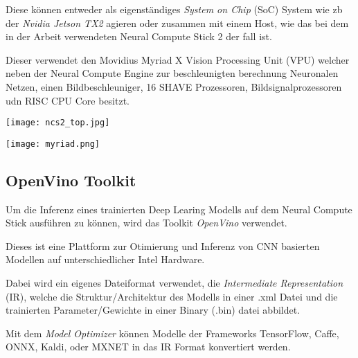 Diese können entweder als eigenständiges \textit{System on Chip}
(SoC) System wie zb der \textit{Nvidia Jetson TX2} agieren oder 
zusammen mit einem Host, wie das bei dem in der Arbeit verwendeten 
Neural Compute Stick 2 der fall ist.

Dieser verwendet den Movidius Myriad X Vision Processing Unit (VPU)
welcher neben der Neural Compute Engine zur beschleunigten berechnung 
Neuronalen Netzen, einen Bildbeschleuniger, 16 SHAVE Prozessoren, 
Bildsignalprozessoren udn RISC CPU Core besitzt.
\cite{haussermannFunktionUndEffizienz}
\\[1cm]
\begin{minipage}{0.4\textwidth}
    \centering
    \label{fig:ncs2}
    \texttt{[image: ncs2\_top.jpg]}
\end{minipage}
\begin{minipage}{0.6\textwidth}
    \centering
    \label{fig:myriad}
    \texttt{[image: myriad.png]}
\end{minipage}


\subsection{OpenVino Toolkit}



Um die Inferenz eines trainierten Deep Learing Modells auf dem
Neural Compute Stick ausführen zu können, wird das Toolkit 
\textit{OpenVino} verwendet.

Dieses ist eine Plattform zur Otimierung und Inferenz von 
CNN basierten Modellen auf unterschiedlicher Intel Hardware.





Dabei wird ein eigenes Dateiformat verwendet, die \textit{Intermediate 
Representation} (IR), welche die Struktur/Architektur des Modells 
in einer .xml Datei und die trainierten Parameter/Gewichte in 
einer Binary (.bin) datei abbildet.

Mit dem \textit{Model Optimizer} können Modelle der Frameworks 
TensorFlow, Caffe, ONNX, Kaldi, oder MXNET in das IR Format 
konvertiert werden.

